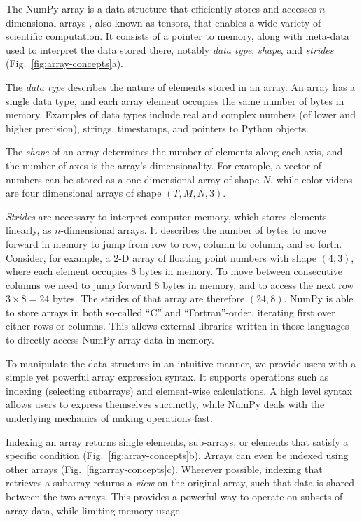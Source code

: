 The NumPy array is a data structure that efficiently stores and accesses
$n$-dimensional arrays \cite{vanderwalt2011numpy}, also known as tensors, that
enables a wide variety of scientific computation.
It consists of a pointer to memory, along with meta-data used to interpret the
data stored there, notably {\em data type}, {\em shape}, and {\em strides}
(Fig.~\ref{fig:array-concepts}a).

The {\em data type} describes the nature of elements stored in an array.
An array has a single data type, and each array element occupies the same
number of bytes in memory.
Examples of data types include real and complex numbers (of lower and higher
precision), strings, timestamps, and pointers to Python objects.

The {\em shape} of an array determines the number of elements along each axis,
and the number of axes is the array's dimensionality.
For example, a vector of numbers can be stored as a one dimensional array of
shape $N$, while color videos are four dimensional arrays of shape
$(T, M, N, 3)$.

{\em Strides} are necessary to interpret computer memory, which stores elements
linearly, as $n$-dimensional arrays.
It describes the number of bytes to move forward in memory to jump from row to
row, column to column, and so forth.
Consider, for example, a 2-D array of floating point numbers with shape
$(4, 3)$, where each element occupies 8 bytes in memory.
To move between consecutive columns we need to jump forward 8 bytes in memory,
and to access the next row $3 \times 8 = 24$ bytes.
The strides of that array are therefore $(24, 8)$.  NumPy is able to
store arrays in both so-called ``C'' and ``Fortran''-order, iterating
first over either rows or columns.  This allows external libraries
written in those languages to directly access NumPy array data in memory.

To manipulate the data structure in an intuitive manner, we provide users with
a simple yet powerful array expression syntax.
It supports operations such as indexing (selecting subarrays) and element-wise
calculations.
A high level syntax allows users to express themselves succinctly, while NumPy
deals with the underlying mechanics of making operations fast.

Indexing an array returns single elements, sub-arrays, or elements that satisfy
a specific condition (Fig.~\ref{fig:array-concepts}b).
Arrays can even be indexed using other arrays (Fig.~\ref{fig:array-concepts}c).
Wherever possible, indexing that retrieves a subarray returns a {\em view} on
the original array, such that data is shared between the two arrays.
This provides a powerful way to operate on subsets of array data, while
limiting memory usage.

